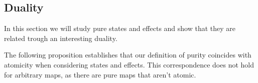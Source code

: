 \documentclass[b5paper,onecolumn,12pt,accepted=2019-05-03, issue=1, volume=1, shorttitle=papers/compositionality-1-1]{compositionalityarticle}
\numberwithin{counter}{section}
\begin{document}


\subsection{Duality}\label{sec:duality}
In this section we will study pure states and effects and show that they are related trough an interesting duality.

The following proposition establishes that our definition of purity coincides with atomicity when considering states and effects. This correspondence does not hold for arbitrary maps, as there are pure maps that aren't atomic.
\end{document}
